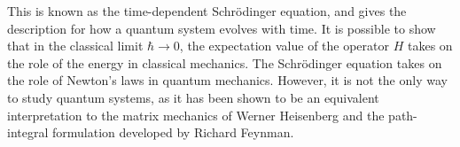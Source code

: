This is known as the time-dependent Schr\"{o}dinger equation,
and gives the description for how a quantum system evolves with time.
It is possible to show that in the classical limit
$\hbar \rightarrow 0$,
the expectation value of the operator $H$ takes on the
role of the energy in classical mechanics.
The Schr\"{o}dinger equation takes on the role
of Newton's laws in quantum mechanics. However, it is not the only
way to study quantum systems, as it has been shown to be an equivalent
interpretation to the matrix mechanics of Werner Heisenberg
and the path-integral formulation developed by Richard Feynman.
